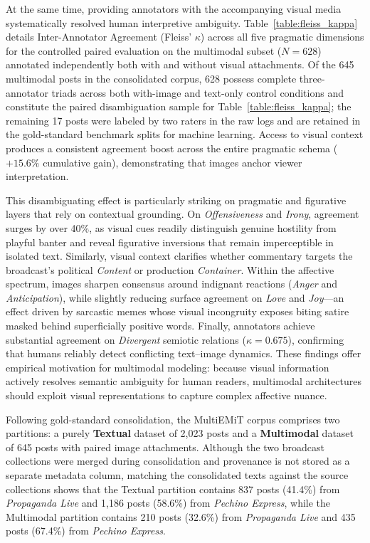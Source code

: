 At the same time, providing annotators with the accompanying visual media systematically resolved human interpretive ambiguity. Table~\ref{table:fleiss_kappa} details Inter-Annotator Agreement (Fleiss' $\kappa$) across all five pragmatic dimensions for the controlled paired evaluation on the multimodal subset ($N = 628$) annotated independently both with and without visual attachments. Of the 645 multimodal posts in the consolidated corpus, 628 possess complete three-annotator triads across both with-image and text-only control conditions and constitute the paired disambiguation sample for Table~\ref{table:fleiss_kappa}; the remaining 17 posts were labeled by two raters in the raw logs and are retained in the gold-standard benchmark splits for machine learning. Access to visual context produces a consistent agreement boost across the entire pragmatic schema ($+15.6\%$ cumulative gain), demonstrating that images anchor viewer interpretation.

This disambiguating effect is particularly striking on pragmatic and figurative layers that rely on contextual grounding. On \textit{Offensiveness} and \textit{Irony}, agreement surges by over 40\%, as visual cues readily distinguish genuine hostility from playful banter and reveal figurative inversions that remain imperceptible in isolated text. Similarly, visual context clarifies whether commentary targets the broadcast's political \textit{Content} or production \textit{Container}. Within the affective spectrum, images sharpen consensus around indignant reactions (\textit{Anger} and \textit{Anticipation}), while slightly reducing surface agreement on \textit{Love} and \textit{Joy}---an effect driven by sarcastic memes whose visual incongruity exposes biting satire masked behind superficially positive words. Finally, annotators achieve substantial agreement on \textit{Divergent} semiotic relations ($\kappa = 0.675$), confirming that humans reliably detect conflicting text--image dynamics. These findings offer empirical motivation for multimodal modeling: because visual information actively resolves semantic ambiguity for human readers, multimodal architectures should exploit visual representations to capture complex affective nuance.

Following gold-standard consolidation, the MultiEMiT corpus comprises two partitions: a purely \textbf{Textual} dataset of 2,023 posts and a \textbf{Multimodal} dataset of 645 posts with paired image attachments. Although the two broadcast collections were merged during consolidation and provenance is not stored as a separate metadata column, matching the consolidated texts against the source collections shows that the Textual partition contains 837 posts (41.4\%) from \textit{Propaganda Live} and 1,186 posts (58.6\%) from \textit{Pechino Express}, while the Multimodal partition contains 210 posts (32.6\%) from \textit{Propaganda Live} and 435 posts (67.4\%) from \textit{Pechino Express}.

